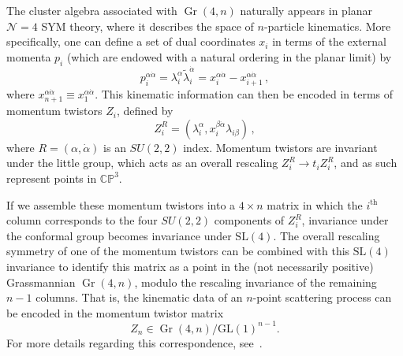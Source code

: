 \documentclass[11pt]{article}
\DeclareMathOperator{\Gr}{Gr}
\begin{document}

The cluster algebra associated with $\Gr(4,n)$ naturally appears in planar $\mathcal{N}=4$ SYM theory, where it describes the space of $n$-particle kinematics. More specifically, one can define a set of dual coordinates $x_i$ in terms of the external momenta $p_i$ (which are endowed with a natural ordering in the planar limit) by
\begin{equation}
p_i^{\alpha \dot \alpha} = \lambda_i^\alpha \tilde \lambda_i^{\dot \alpha} = x_i^{\alpha \dot \alpha} - x_{i+1}^{\alpha \dot \alpha} \, , \label{eq:dual_coordiantes}
\end{equation}
where $x_{n+1}^{\alpha \dot \alpha} \equiv x_1^{\alpha \dot \alpha}$. This kinematic information can then be encoded in terms of momentum twistors $Z_i$, defined by
\begin{equation}
Z^R_i = (\lambda_i^\alpha, x_i^{\beta \dot \alpha} \lambda_{i \beta}) \, ,
\end{equation}
where $R = (\alpha, \dot \alpha)$ is an $SU(2,2)$ index. Momentum twistors are invariant under the little group, which acts as an overall rescaling $Z_i^R \rightarrow  t_i Z_i^R$, and as such represent points in $\mathbb{CP}^3$. 

If we assemble these momentum twistors into a $4 \times n$ matrix in which the $i^\text{th}$ column corresponds to the four $SU(2,2)$ components of $Z_i^R$, invariance under the conformal group becomes invariance under $\text{SL}(4)$. The overall rescaling symmetry of one of the momentum twistors can be combined with this $\text{SL}(4)$ invariance to identify this matrix as a point in the (not necessarily positive) Grassmannian $\Gr(4,n)$, modulo the rescaling invariance of the remaining $n-1$ columns. That is, the kinematic data of an $n$-point scattering process can be encoded in the momentum twistor matrix
\begin{equation}
Z_n \in \Gr(4,n)/\text{GL}(1)^{n-1}.
\end{equation}
For more details regarding this correspondence, see~\cite{ArkaniHamed:2012nw,Golden:2013xva}. 
\end{document}
